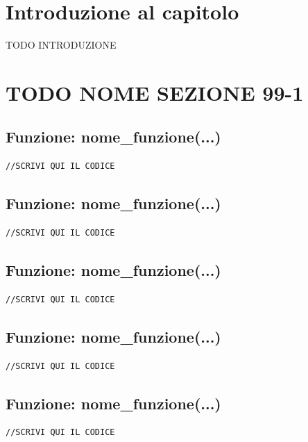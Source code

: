 

\label{capitolo99}

\section{Introduzione al capitolo} \label{99-1}
TODO INTRODUZIONE

\section{TODO NOME SEZIONE 99-1} \label{99-1}



\subsection{Funzione: nome\_funzione(...)}
\begin{lstlisting}[language=Arduino]
//SCRIVI QUI IL CODICE
\end{lstlisting}
\noindent\makebox[\linewidth]{\rule{15mm}{.4mm}}


\subsection{Funzione: nome\_funzione(...)}
\begin{lstlisting}[language=Arduino]
//SCRIVI QUI IL CODICE
\end{lstlisting}
\noindent\makebox[\linewidth]{\rule{15mm}{.4mm}}


\subsection{Funzione: nome\_funzione(...)}
\begin{lstlisting}[language=Arduino]
//SCRIVI QUI IL CODICE
\end{lstlisting}
\noindent\makebox[\linewidth]{\rule{15mm}{.4mm}}


\subsection{Funzione: nome\_funzione(...)}
\begin{lstlisting}[language=Arduino]
//SCRIVI QUI IL CODICE
\end{lstlisting}
\noindent\makebox[\linewidth]{\rule{15mm}{.4mm}}


\subsection{Funzione: nome\_funzione(...)}
\begin{lstlisting}[language=Arduino]
//SCRIVI QUI IL CODICE
\end{lstlisting}
\noindent\makebox[\linewidth]{\rule{15mm}{.4mm}}


